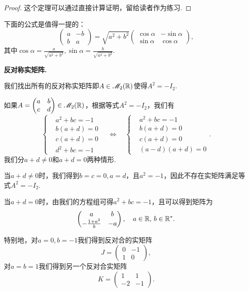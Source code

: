   \begin{proof}
    这个定理可以通过直接计算证明，留给读者作为练习.
  \end{proof}

  下面的公式是值得一提的：
  \[
    \begin{pmatrix}
      a & -b \\
      b & a
    \end{pmatrix} = \sqrt{a^2+b^2}
    \begin{pmatrix}
      \cos\alpha & -\sin \alpha \\
      \sin\alpha & \cos\alpha
    \end{pmatrix},
  \]
  其中$\cos\alpha=\frac a{\sqrt{a^2+b^2}},\sin\alpha=\frac b{\sqrt{a^2+b^2}}$.

  \begin{example}{\bfseries 反对称实矩阵.}

  我们找出所有的反对称实矩阵即$A\in\mathscr M_2(\mathbb R)$使得$A^2=-I_2$.

  如果$A=\begin{pmatrix}
    a & b \\
    c & d
  \end{pmatrix}\in\mathscr M_2(\mathbb R)$，根据等式$A^2=-I_2$，我们有
  \[
    \left\{
      \begin{aligned}
        & a^2 + bc = -1\\
        & b(a+d) = 0 \\
        & c(a+d) = 0 \\
        & d^2 + bc = -1
      \end{aligned}
    \right.\quad \Leftrightarrow\quad
    \left\{
      \begin{aligned}
        & a^2 + bc = -1\\
        & b(a+d) = 0 \\
        & c(a+d) = 0 \\
        & (a-d)(a+d) = 0
      \end{aligned}
    \right..
  \]
  我们分$a+d\ne0$和$a+d=0$两种情形.

  当$a+d\ne0$时，我们得到$b=c=0,a=d$，且$a^2=-1$，因此不存在实矩阵满足等式$A^2=-I_2$.

  当$a+d=0$时，由我们的方程组可得$a^2+bc=-1$，且可以得到矩阵为
  \[
    \begin{pmatrix}
      a & b \\
      -\frac{1+a^2}b & -a
    \end{pmatrix},\quad a\in\mathbb R,\,b\in\mathbb R^\ast.
  \]

  特别地，对$a=0,b=-1$我们得到反对合的实矩阵
  \[
    J = \begin{pmatrix}
      0 & -1 \\
      1 & 0
    \end{pmatrix},
  \]
  对$a=b=1$我们得到另一个反对合实矩阵
  \[
    K = \begin{pmatrix}
      1 & 1 \\
      -2 & -1
    \end{pmatrix}.
  \]
  \end{example}

